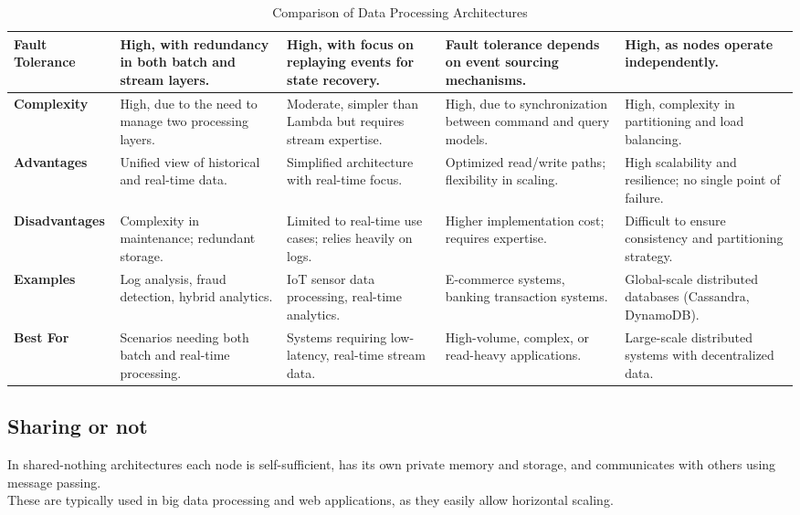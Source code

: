 \begin{table}[htbp]
{\begin{tabular}{|>{\raggedright\arraybackslash}p{1.8cm}|>{\raggedright\arraybackslash}p{2.8cm}|>{\raggedright\arraybackslash}p{2.8cm}|>{\raggedright\arraybackslash}p{2.8cm}|>{\raggedright\arraybackslash}p{2.8cm}|}
\hline
\textbf{Fault Tolerance} & High, with redundancy in both batch and stream layers. & High, with focus on replaying events for state recovery. & Fault tolerance depends on event sourcing mechanisms. & High, as nodes operate independently. \\
\hline
\textbf{Complexity} & High, due to the need to manage two processing layers. & Moderate, simpler than Lambda but requires stream expertise. & High, due to synchronization between command and query models. & High, complexity in partitioning and load balancing. \\
\hline
\textbf{Advantages} & Unified view of historical and real-time data. & Simplified architecture with real-time focus. & Optimized read/write paths; flexibility in scaling. & High scalability and resilience; no single point of failure. \\
\hline
\textbf{Disadvantages} & Complexity in maintenance; redundant storage. & Limited to real-time use cases; relies heavily on logs. & Higher implementation cost; requires expertise. & Difficult to ensure consistency and partitioning strategy. \\
\hline
\textbf{Examples} & Log analysis, fraud detection, hybrid analytics. & IoT sensor data processing, real-time analytics. & E-commerce systems, banking transaction systems. & Global-scale distributed databases (Cassandra, DynamoDB). \\
\hline
\textbf{Best For} & Scenarios needing both batch and real-time processing. & Systems requiring low-latency, real-time stream data. & High-volume, complex, or read-heavy applications. & Large-scale distributed systems with decentralized data. \\
\hline
\end{tabular}%
}
\caption{Comparison of Data Processing Architectures}
\label{tab:dataprocessingarchitectures}
\end{table}



\subsection{Sharing or not}

In shared-nothing architectures each node is self-sufficient, has its own private memory and storage, and communicates with others using message passing.\\
These are typically used in big data processing and web applications, as they easily allow horizontal scaling.


